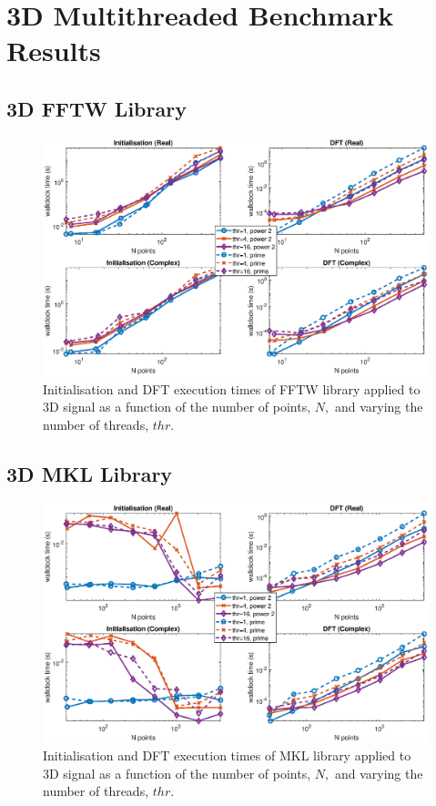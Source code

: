 \documentclass[a4paper]{article}
\begin{document}
\section{3D Multithreaded Benchmark Results}\label{Sec:3DMulti}


\subsection{3D FFTW Library}\label{Sec:3DFFTW}




\begin{figure}[htb]
    \centering
    \includegraphics[width=\linewidth]{../results/fftw_3d_thr.eps}
  \caption{Initialisation and DFT execution times of FFTW library applied to 3D signal as a function of the
    number of points, $N,$ and varying the number of threads, $thr.$ }
  \label{3DFFTW}
\end{figure}

\subsection{3D MKL Library}\label{Sec:3DMKL}




\begin{figure}[htb]
    \centering
    \includegraphics[width=\linewidth]{../results/mkl_3d_thr.eps}
  \caption{Initialisation and DFT execution times of MKL library applied to 3D signal as a function of the
    number of points, $N,$ and varying the number of threads, $thr.$ }
  \label{3DMKL}
\end{figure}
\end{document}
